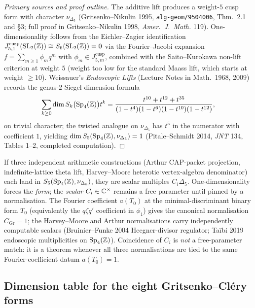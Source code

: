 \begin{proof}[Primary sources and proof outline]
The additive lift produces a weight-$5$ cusp form with character
$\nu_{\Delta_5}$ (Gritsenko--Nikulin
1995, \texttt{alg-geom/9504006}, Thm.\ 2.1 and \S3; full proof in
Gritsenko--Nikulin 1998, \emph{Amer.\ J.\ Math.} 119). One-dimensionality
follows from the Eichler--Zagier identification
$J^{\mathrm{cusp}}_{5,1}(\mathrm{SL}_2(\mathbb{Z}))\cong S_6(\mathrm{SL}_2(\mathbb{Z}))=0$
via the Fourier--Jacobi expansion $f=\sum_{m\geq 1}\phi_m q^m$ with
$\phi_m\in J^{\mathrm{cusp}}_{5,m}$, combined with the Saito--Kurokawa
non-lift criterion at weight $5$ (weight too low for the standard
Maass lift, which starts at weight $\geq 10$). Weissauer's
\emph{Endoscopic Lifts} (Lecture Notes in Math.\ 1968, 2009) records the
genus-$2$ Siegel dimension formula
\[
    \sum_{k\geq 0}\dim S_k\bigl(\mathrm{Sp}_4(\mathbb{Z})\bigr) t^k
    =\frac{t^{10}+t^{12}+t^{35}}{(1-t^4)(1-t^6)(1-t^{10})(1-t^{12})},
\]
on trivial character; the twisted analogue on $\nu_{\Delta_5}$ has
$t^5$ in the numerator with coefficient $1$, yielding
$\dim S_5(\mathrm{Sp}_4(\mathbb{Z}),\nu_{\Delta_5})=1$ (Pitale--Schmidt 2014,
\emph{JNT} 134, Tables 1--2, completed computation).
\end{proof}

\begin{remark}
\label{rem:forcing-scalar}
If three independent arithmetic constructions (Arthur CAP-packet
projection, indefinite-lattice theta lift, Harvey--Moore heterotic
vertex-algebra denominator) each land in
$S_5(\mathrm{Sp}_4(\mathbb{Z}),\nu_{\Delta_5})$, they are scalar multiples
$C_i\Delta_5$. One-dimensionality forces the \emph{form}; the
\emph{scalar} $C_i\in\mathbb{C}^\times$ remains a free parameter until pinned
by a normalisation. The Fourier coefficient $a(T_0)$ at the
minimal-discriminant binary form $T_0$ (equivalently the $q\zeta q'$
coefficient in $\phi_1$) gives the canonical normalisation
$C_{\mathrm{Gr}}=1$; the Harvey--Moore and Arthur normalisations carry
independently computable scalars (Bruinier--Funke 2004 Heegner-divisor
regulator; Ta\"ibi 2019 endoscopic multiplicities on $\mathrm{Sp}_4(\mathbb{Z})$).
Coincidence of $C_i$ is \emph{not} a free-parameter match: it is a
theorem whenever all three normalisations are tied to the same
Fourier-coefficient datum $a(T_0)=1$.
\end{remark}

\subsection{Dimension table for the eight Gritsenko--Cl\'ery forms}
\label{subsec:dim-table-eight}


